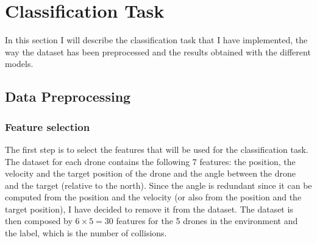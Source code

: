 \section{Classification Task}
\label{sec:classification}
In this section I will describe the classification task that I have implemented, the way the dataset has been preprocessed and the results obtained with the different models.

\subsection{Data Preprocessing}
\label{sec:preprocessing}

\subsubsection{Feature selection}
\label{sec:preprocessing-feature-selection}
The first step is to select the features that will be used for the classification task.
The dataset for each drone contains the following 7 features: the position, the velocity and the target position of the drone and the angle between the drone and the target (relative to the north).
Since the angle is redundant since it can be computed from the position and the velocity (or also from the position and the target position), I have decided to remove it from the dataset.
The dataset is then composed by $6 \times 5 = 30$ features for the 5 drones in the environment and the label, which is the number of collisions.

